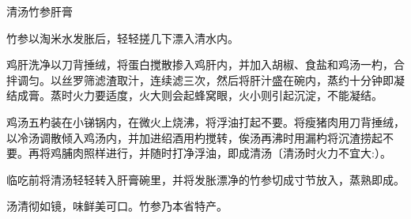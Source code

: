 \begin{recipe}{清汤竹参肝膏}

\ingredients




\cooking

竹参以淘米水发胀后，轻轻搓几下漂入清水内。

鸡肝洗净以刀背捶绒，将蛋白搅散掺入鸡肝内，并加入胡椒、食盐和鸡汤一杓，合拌调匀。以丝罗筛滤渣取汁，连续滤三次，然后将肝汁盛在碗内，蒸约十分钟即凝结成膏。蒸时火力要适度，火大则会起蜂窝眼，火小则引起沉淀，不能凝结。

鸡汤五杓装在小锑锅内，在微火上烧沸，将浮油打起不要。将瘦猪肉用刀背捶绒，以冷汤调散倾入鸡汤内，并加进绍酒用杓搅转，俟汤再沸时用漏杓将沉渣捞起不要。再将鸡脯肉照样进行，并随时打净浮油，即成清汤〔清汤时火力不宜大:）。

临吃前将清汤轻轻转入肝膏碗里，并将发胀漂净的竹参切成寸节放入，蒸熟即成。

\notes

汤清彻如镜，味鲜美可口。竹参乃本省特产。

\end{recipe}

